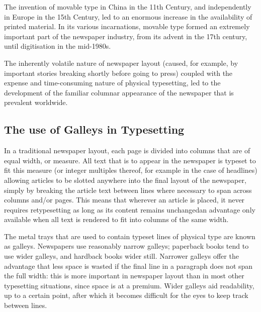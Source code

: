 The invention of movable type in China in the 11th Century, and independently in Europe in the 15th Century, led to an enormous increase in the availability of printed material. In its various incarnations, movable type formed an extremely important part of the newspaper industry, from its advent in the 17th century, until digitisation in the mid-1980s.

The inherently volatile nature of newspaper layout (caused, for example, by important stories breaking shortly before going to press) coupled with the expense and time-consuming nature of physical typesetting, led to the development of the familiar columnar appearance of the newspaper that is prevalent worldwide.

\subsection{The use of Galleys in Typesetting}
\label{sec:galleys}
In a traditional newspaper layout, each page is divided into columns that are of equal width, or \gls{measure}. All text that is to appear in the newspaper is typeset to fit this measure (or integer multiples thereof, for example in the case of headlines) allowing articles to be slotted anywhere into the final layout of the newspaper, simply by breaking the article text between lines where necessary to span across columns and/or pages. This means that wherever an article is placed, it never requires retypesetting as long as its content remains unchanged\ed{}an advantage only available when all text is rendered to fit into columns of the same width.


The metal trays that are used to contain typeset lines of physical type are known as \glspl{galley}. Newspapers use reasonably narrow galleys; paperback books tend to use wider galleys, and hardback books wider still. Narrower galleys offer the advantage that less space is wasted if the final line in a paragraph does not span the full width:  this is more important in newspaper layout than in most other typesetting situations, since space is at a premium. Wider galleys aid readability, up to a certain point, after which it becomes difficult for the eyes to keep track between lines.\hspace{0pt}\cite{Bringhurst2008, Braganza2009, Voorhees2011}


